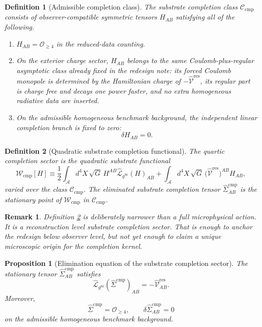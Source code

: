 \documentclass[11pt]{article}
\newcommand{\Sub}{\mathcal A}
\newcommand{\ObserverMetric}{g^{\mathrm{br}}}
\newcommand{\CompLift}{\widehat\Sigma^{\mathrm{cmp}}}
\newcommand{\ResidualLift}{\widehat{\mathcal V}^{\mathrm{res}}}
\newcommand{\CompFunctional}{\mathcal W_{\mathrm{cmp}}}
\newcommand{\SubReducedEin}{\widehat{\mathcal L}_{\ObserverMetric}}
\newcommand{\CompClass}{\mathscr C_{\mathrm{cmp}}}
\newtheorem{definition}{Definition}
\newtheorem{proposition}{Proposition}
\newtheorem{remark}{Remark}
\begin{document}
\begin{definition}[Admissible completion class]
\label{def:class}
The \emph{substrate completion class} \(\CompClass\) consists of observer-compatible symmetric tensors \(H_{AB}\) satisfying all of the following.
\begin{enumerate}
    \item \(H_{AB}=\mathcal O_{\ge 4}\) in the reduced-data counting.
    \item On the exterior charge sector, \(H_{AB}\) belongs to the same Coulomb-plus-regular asymptotic class already fixed in the redesign note: its forced Coulomb monopole is determined by the Hamiltonian charge of \(-\ResidualLift\), its regular part is charge free and decays one power faster, and no extra homogeneous radiative data are inserted.
    \item On the admissible homogeneous benchmark background, the independent linear completion branch is fixed to zero:
    \begin{equation}
    \delta H_{AB}=0.
    \label{eq:nolinearsub}
    \end{equation}
\end{enumerate}
\end{definition}

\begin{definition}[Quadratic substrate completion functional]
\label{def:functional}
The \emph{quartic completion sector} is the quadratic substrate functional
\begin{equation}
\CompFunctional[H]
\equiv
\frac12
\int_{\Sub} d^4X\,\sqrt{G}\,
H^{AB}\SubReducedEin(H)_{AB}
+
\int_{\Sub} d^4X\,\sqrt{G}\,
\bigl(\ResidualLift\bigr)^{AB}H_{AB},
\label{eq:functional}
\end{equation}
varied over the class \(\CompClass\). The eliminated substrate completion tensor \(\CompLift_{AB}\) is the stationary point of \(\CompFunctional\) in \(\CompClass\).
\end{definition}

\begin{remark}
Definition \ref{def:functional} is deliberately narrower than a full microphysical action. It is a reconstruction level substrate completion sector. That is enough to anchor the redesign below observer level, but not yet enough to claim a unique microscopic origin for the completion kernel.
\end{remark}

\begin{proposition}[Elimination equation of the substrate completion sector]
\label{prop:elim}
The stationary tensor \(\CompLift_{AB}\) satisfies
\begin{equation}
\SubReducedEin(\CompLift)_{AB}
=
-\ResidualLift_{AB}.
\label{eq:subsolve}
\end{equation}
Moreover,
\begin{equation}
\CompLift=\mathcal O_{\ge 4},
\qquad
\delta\CompLift_{AB}=0
\label{eq:quarticsub}
\end{equation}
on the admissible homogeneous benchmark background.
\end{proposition}
\end{document}
